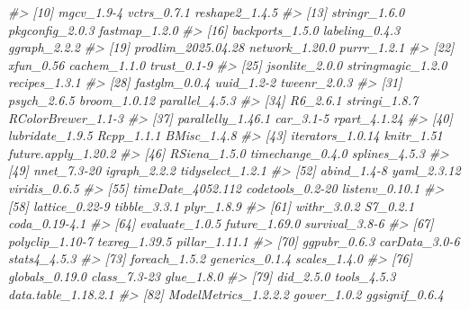 \documentclass[
]{article}
\newenvironment{Shaded}{\begin{snugshade}}{\end{snugshade}}
\newcommand{\CommentTok}[1]{\textcolor[rgb]{0.56,0.35,0.01}{\textit{#1}}}
\begin{document}
\begin{Shaded}
\begin{Highlighting}[]
\CommentTok{\#\textgreater{}  [10] mgcv\_1.9{-}4            vctrs\_0.7.1           reshape2\_1.4.5       }
\CommentTok{\#\textgreater{}  [13] stringr\_1.6.0         pkgconfig\_2.0.3       fastmap\_1.2.0        }
\CommentTok{\#\textgreater{}  [16] backports\_1.5.0       labeling\_0.4.3        ggraph\_2.2.2         }
\CommentTok{\#\textgreater{}  [19] prodlim\_2025.04.28    network\_1.20.0        purrr\_1.2.1          }
\CommentTok{\#\textgreater{}  [22] xfun\_0.56             cachem\_1.1.0          trust\_0.1{-}9          }
\CommentTok{\#\textgreater{}  [25] jsonlite\_2.0.0        stringmagic\_1.2.0     recipes\_1.3.1        }
\CommentTok{\#\textgreater{}  [28] fastglm\_0.0.4         uuid\_1.2{-}2            tweenr\_2.0.3         }
\CommentTok{\#\textgreater{}  [31] psych\_2.6.5           broom\_1.0.12          parallel\_4.5.3       }
\CommentTok{\#\textgreater{}  [34] R6\_2.6.1              stringi\_1.8.7         RColorBrewer\_1.1{-}3   }
\CommentTok{\#\textgreater{}  [37] parallelly\_1.46.1     car\_3.1{-}5             rpart\_4.1.24         }
\CommentTok{\#\textgreater{}  [40] lubridate\_1.9.5       Rcpp\_1.1.1            BMisc\_1.4.8          }
\CommentTok{\#\textgreater{}  [43] iterators\_1.0.14      knitr\_1.51            future.apply\_1.20.2  }
\CommentTok{\#\textgreater{}  [46] RSiena\_1.5.0          timechange\_0.4.0      splines\_4.5.3        }
\CommentTok{\#\textgreater{}  [49] nnet\_7.3{-}20           igraph\_2.2.2          tidyselect\_1.2.1     }
\CommentTok{\#\textgreater{}  [52] abind\_1.4{-}8           yaml\_2.3.12           viridis\_0.6.5        }
\CommentTok{\#\textgreater{}  [55] timeDate\_4052.112     codetools\_0.2{-}20      listenv\_0.10.1       }
\CommentTok{\#\textgreater{}  [58] lattice\_0.22{-}9        tibble\_3.3.1          plyr\_1.8.9           }
\CommentTok{\#\textgreater{}  [61] withr\_3.0.2           S7\_0.2.1              coda\_0.19{-}4.1        }
\CommentTok{\#\textgreater{}  [64] evaluate\_1.0.5        future\_1.69.0         survival\_3.8{-}6       }
\CommentTok{\#\textgreater{}  [67] polyclip\_1.10{-}7       texreg\_1.39.5         pillar\_1.11.1        }
\CommentTok{\#\textgreater{}  [70] ggpubr\_0.6.3          carData\_3.0{-}6         stats4\_4.5.3         }
\CommentTok{\#\textgreater{}  [73] foreach\_1.5.2         generics\_0.1.4        scales\_1.4.0         }
\CommentTok{\#\textgreater{}  [76] globals\_0.19.0        class\_7.3{-}23          glue\_1.8.0           }
\CommentTok{\#\textgreater{}  [79] did\_2.5.0             tools\_4.5.3           data.table\_1.18.2.1  }
\CommentTok{\#\textgreater{}  [82] ModelMetrics\_1.2.2.2  gower\_1.0.2           ggsignif\_0.6.4       }

\end{Highlighting}
\end{Shaded}
\end{document}
